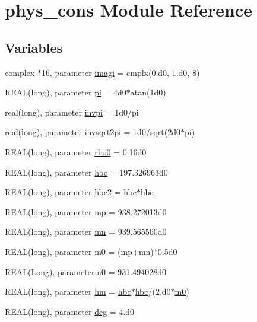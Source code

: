 \hypertarget{namespacephys__cons}{
\section{phys\_\-cons Module Reference}
\label{namespacephys__cons}
}
\subsection*{Variables}
\begin{DoxyCompactItemize}
\item 
complex $\ast$16, parameter \hyperlink{namespacephys__cons_a0dbb22856790b16e206de451e9cdd74a}{imagi} = cmplx(0.d0, 1.d0, 8)
\item 
REAL(long), parameter \hyperlink{namespacephys__cons_aae3c6cb8ae765b0262bb110ff739ba9d}{pi} = 4d0$\ast$atan(1d0)
\item 
real(long), parameter \hyperlink{namespacephys__cons_aa8683f00f4216acc1822dfcb85b1ee00}{invpi} = 1d0/pi
\item 
real(long), parameter \hyperlink{namespacephys__cons_a369d33713444a99a71f80a74c0652d4e}{invsqrt2pi} = 1d0/sqrt(2d0$\ast$pi)
\item 
REAL(long), parameter \hyperlink{namespacephys__cons_a4b10513970a98ad78b85723c60d9a8b6}{rho0} = 0.16d0
\item 
REAL(long), parameter \hyperlink{namespacephys__cons_a3f47589553abc71257ab3e88ef7bbb39}{hbc} = 197.326963d0
\item 
REAL(long), parameter \hyperlink{namespacephys__cons_af78d210174277076bb64ff4403f8c9fd}{hbc2} = \hyperlink{namespacephys__cons_a3f47589553abc71257ab3e88ef7bbb39}{hbc}$\ast$\hyperlink{namespacephys__cons_a3f47589553abc71257ab3e88ef7bbb39}{hbc}
\item 
REAL(long), parameter \hyperlink{namespacephys__cons_ae2a4cb4e421fe399f19d0729b5617fed}{mp} = 938.272013d0
\item 
REAL(long), parameter \hyperlink{namespacephys__cons_ad68aaba74b75e1e13f1367c1eb0904c1}{mn} = 939.565560d0
\item 
REAL(long), parameter \hyperlink{namespacephys__cons_a2e392d52d36b5c1db0d17928aa40f35b}{m0} = (\hyperlink{namespacephys__cons_ae2a4cb4e421fe399f19d0729b5617fed}{mp}+\hyperlink{namespacephys__cons_ad68aaba74b75e1e13f1367c1eb0904c1}{mn})$\ast$0.5d0
\item 
REAL(Long), parameter \hyperlink{namespacephys__cons_a02e8bb2c808e0085a317bf36ff79ae2a}{a0} = 931.494028d0
\item 
REAL(long), parameter \hyperlink{namespacephys__cons_ad97ad749ef4f8f66c56a0facb7394cb5}{hm} = \hyperlink{namespacephys__cons_a3f47589553abc71257ab3e88ef7bbb39}{hbc}$\ast$\hyperlink{namespacephys__cons_a3f47589553abc71257ab3e88ef7bbb39}{hbc}/(2.d0$\ast$\hyperlink{namespacephys__cons_a2e392d52d36b5c1db0d17928aa40f35b}{m0})
\item 
REAL(long), parameter \hyperlink{namespacephys__cons_a553e3e17652770308e6bffcb8fcb5a95}{deg} = 4.d0
\end{DoxyCompactItemize}



